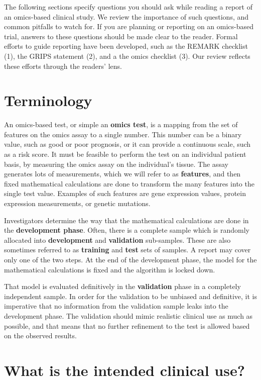\documentclass[11pt]{article}
\begin{document}
The following sections specify questions you should ask while reading a
report of an omics-based clinical study. We review the importance of
such questions, and common pitfalls to watch for. If you are planning or
reporting on an omics-based trial, answers to these questions should be
made clear to the reader. Formal efforts to guide reporting have been
developed, such as the REMARK checklist (1), the GRIPS statement (2),
and a the omics checklist (3). Our review reflects these efforts through
the readers' lens.

\section{Terminology}\label{terminology}

An omics-based test, or simple an \textbf{omics test}, is a mapping from
the set of features on the omics assay to a single number. This number
can be a binary value, such as good or poor prognosis, or it can provide
a continuous scale, such as a risk score. It must be feasible to perform
the test on an individual patient basis, by measuring the omics assay on
the individual's tissue. The assay generates lots of measurements, which
we will refer to as \textbf{features}, and then fixed mathematical
calculations are done to transform the many features into the single
test value. Examples of such features are gene expression values,
protein expression measurements, or genetic mutations.

Investigators determine the way that the mathematical calculations are
done in the \textbf{development phase}. Often, there is a complete
sample which is randomly allocated into \textbf{development} and
\textbf{validation} sub-samples. These are also sometimes referred to as
\textbf{training} and \textbf{test} sets of samples. A report may cover
only one of the two steps. At the end of the development phase, the
model for the mathematical calculations is fixed and the algorithm is
locked down.

That model is evaluated definitively in the \textbf{validation} phase in
a completely independent sample. In order for the validation to be
unbiased and definitive, it is imperative that no information from the
validation sample leaks into the development phase. The validation
should mimic realistic clinical use as much as possible, and that means
that no further refinement to the test is allowed based on the observed
results.

\section{What is the intended clinical
use?}\label{what-is-the-intended-clinical-use}
\end{document}
